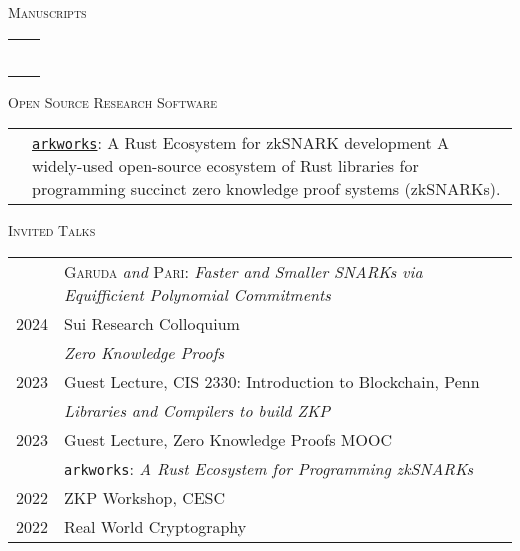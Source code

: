 \documentclass[11pt]{article}
\newenvironment{SectionTable}[1]{
	\renewcommand*{\arraystretch}{1.7}
	\setlength{\tabcolsep}{6pt}
  {\Large \textsc{#1}}
	\begin{longtable}{Rp{5.4in}}}
{\end{longtable}\vspace{-0.2cm}}
\newenvironment{SectionTableSingleSpace}[1]{
	\renewcommand*{\arraystretch}{1.2}
	\setlength{\tabcolsep}{6pt}
  {\Large \textsc{#1}}
	\begin{longtable}{Rp{5.4in}}}
{\end{longtable}\vspace{-0.2cm}}
\begin{document}
\begin{cv}{\vspace{-5em}}
  \begin{refsection}
    \newrefcontext[labelprefix=P] %
    \begin{SectionTable}{Manuscripts}
      \cite{BunzMNW24b} &  \\
      \cite{DellepereMS24} &  \\
      \cite{HuMWXYZ24} &  \\
      \cite{FalkMS24} &  \\
      \cite{BunzMNW24a} &  \\
      \cite{BawejaMMNW24} &  \\
    \end{SectionTable}
    \newsavebox\preprintbib
    \savebox{}
  \end{refsection}
  
  \begin{SectionTable}{Open Source Research Software}
    & 
    \href{https://github.com/arkworks-rs}{\texttt{arkworks}}: A Rust Ecosystem for zkSNARK development \newline
    A widely-used open-source ecosystem of Rust libraries for programming succinct zero knowledge proof systems (zkSNARKs).
  \end{SectionTable}
  
  \begin{SectionTableSingleSpace}{Invited Talks}
    & \textsc{Garuda} \emph{and} \textsc{Pari}: \emph{Faster and Smaller SNARKs via Equifficient Polynomial Commitments}\\
    2024 & Sui Research Colloquium\\[0.4em]

    & \emph{Zero Knowledge Proofs} \\
    2023 & Guest Lecture, CIS 2330: Introduction to Blockchain, Penn\\[0.4em]
    
    & \emph{Libraries and Compilers to build ZKP}\\
    2023 & Guest Lecture, Zero Knowledge Proofs MOOC\\[0.4em]

    & \texttt{arkworks}: \emph{A Rust Ecosystem for Programming zkSNARKs} \\
    2022 & ZKP Workshop, CESC \\
    2022 & Real World Cryptography \\[0.4em]


\end{SectionTableSingleSpace}
\end{cv}
\end{document}
